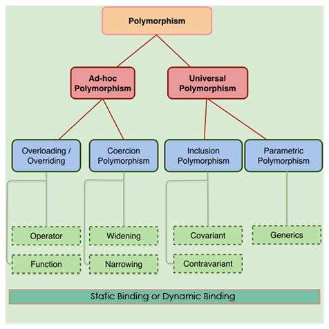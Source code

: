 \documentclass[a4paper, 11pt]{article}
\begin{document}
        \begin{center}
            \includegraphics[scale=0.8]{polymorphism}
        \end{center}
\end{document}
